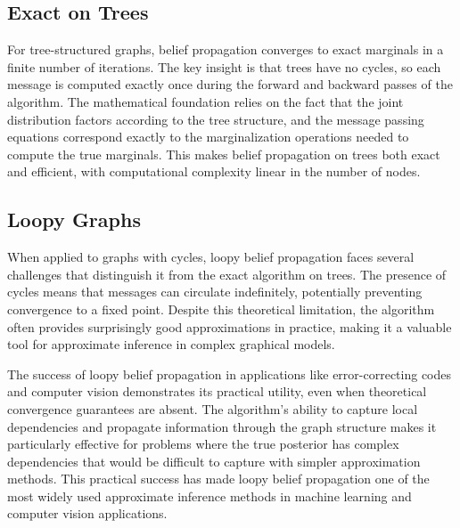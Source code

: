 \subsection{Exact on Trees}

For tree-structured graphs, belief propagation converges to exact marginals in a finite number of iterations. The key insight is that trees have no cycles, so each message is computed exactly once during the forward and backward passes of the algorithm. The mathematical foundation relies on the fact that the joint distribution factors according to the tree structure, and the message passing equations correspond exactly to the marginalization operations needed to compute the true marginals. This makes belief propagation on trees both exact and efficient, with computational complexity linear in the number of nodes.

\subsection{Loopy Graphs}

When applied to graphs with cycles, loopy belief propagation faces several challenges that distinguish it from the exact algorithm on trees. The presence of cycles means that messages can circulate indefinitely, potentially preventing convergence to a fixed point. Despite this theoretical limitation, the algorithm often provides surprisingly good approximations in practice, making it a valuable tool for approximate inference in complex graphical models.

The success of loopy belief propagation in applications like error-correcting codes and computer vision demonstrates its practical utility, even when theoretical convergence guarantees are absent. The algorithm's ability to capture local dependencies and propagate information through the graph structure makes it particularly effective for problems where the true posterior has complex dependencies that would be difficult to capture with simpler approximation methods. This practical success has made loopy belief propagation one of the most widely used approximate inference methods in machine learning and computer vision applications.




